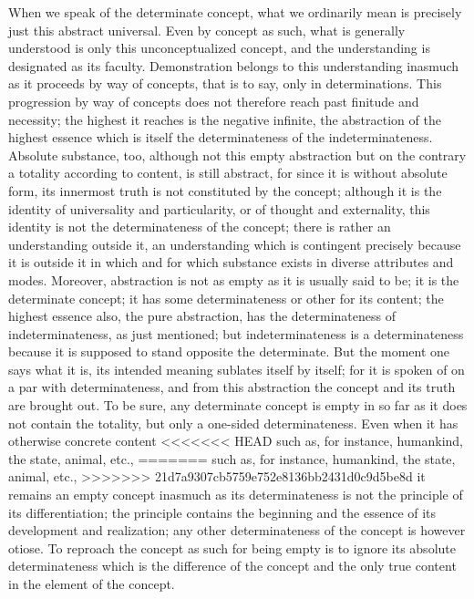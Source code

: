 When we speak of the determinate concept,
what we ordinarily mean is
precisely just this abstract universal.
Even by concept as such,
what is generally understood is
only this unconceptualized concept,
and the understanding is designated as its faculty.
Demonstration belongs to this understanding
inasmuch as it proceeds by way of concepts,
that is to say, only in determinations.
This progression by way of concepts does not therefore
reach past finitude and necessity;
the highest it reaches is the negative infinite,
the abstraction of the highest essence
which is itself the determinateness
of the indeterminateness.
Absolute substance, too, although not this empty abstraction
but on the contrary a totality according to content,
is still abstract, for since it is without absolute form,
its innermost truth is not constituted by the concept;
although it is the identity of universality and particularity,
or of thought and externality,
this identity is not the determinateness of the concept;
there is rather an understanding outside it,
an understanding which is contingent precisely
because it is outside it in which and for which
substance exists in diverse attributes and modes.
Moreover, abstraction is not as empty as
it is usually said to be;
it is the determinate concept;
it has some determinateness or other for its content;
the highest essence also, the pure abstraction,
has the determinateness of indeterminateness,
as just mentioned;
but indeterminateness is a determinateness
because it is supposed to stand opposite the determinate.
But the moment one says what it is,
its intended meaning sublates itself by itself;
for it is spoken of on a par with determinateness,
and from this abstraction the concept and its truth are brought out.
To be sure, any determinate concept is empty
in so far as it does not contain the totality,
but only a one-sided determinateness.
Even when it has otherwise concrete content
<<<<<<< HEAD
such as, for instance, humankind, the state, animal, etc., 
=======
such as, for instance, humankind, the state, animal, etc.,
>>>>>>> 21d7a9307cb5759e752e8136bb2431d0c9d5be8d
it remains an empty concept inasmuch as its determinateness is
not the principle of its differentiation;
the principle contains the beginning and the essence
of its development and realization;
any other determinateness of the concept is however otiose.
To reproach the concept as such for being empty is
to ignore its absolute determinateness
which is the difference of the concept
and the only true content in the element of the concept.

